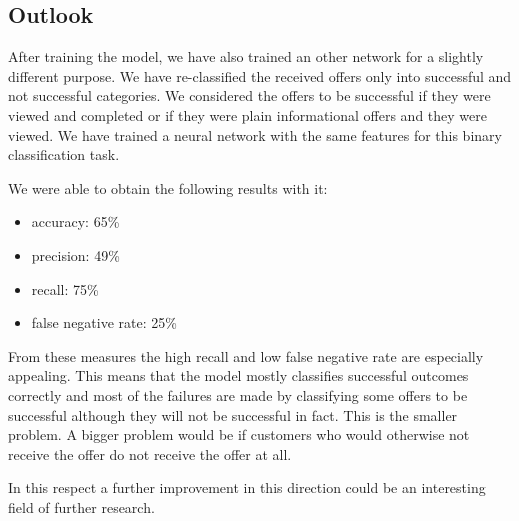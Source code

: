 \subsection{Outlook}

After training the model, we have also trained an other network for a slightly different purpose. We have re-classified the received offers only into successful and not successful categories. We considered the offers to be successful if they were viewed and completed or if they were plain informational offers and they were viewed. We have trained a neural network with the same features for this binary classification task. 

We were able to obtain the following results with it:
\begin{itemize}
	\item accuracy: 65\%
	\item precision: 49\%
	\item recall: 75\%
	\item false negative rate: 25\%
\end{itemize}

From these measures the high recall and low false negative rate are especially appealing. This means that the model mostly classifies successful outcomes correctly and most of the failures are made by classifying some offers to be successful although they will not be successful in fact. This is the smaller problem. A bigger problem would be if customers who would otherwise not receive the offer do not receive the offer at all.

In this respect a further improvement in this direction could be an interesting field of further research.














